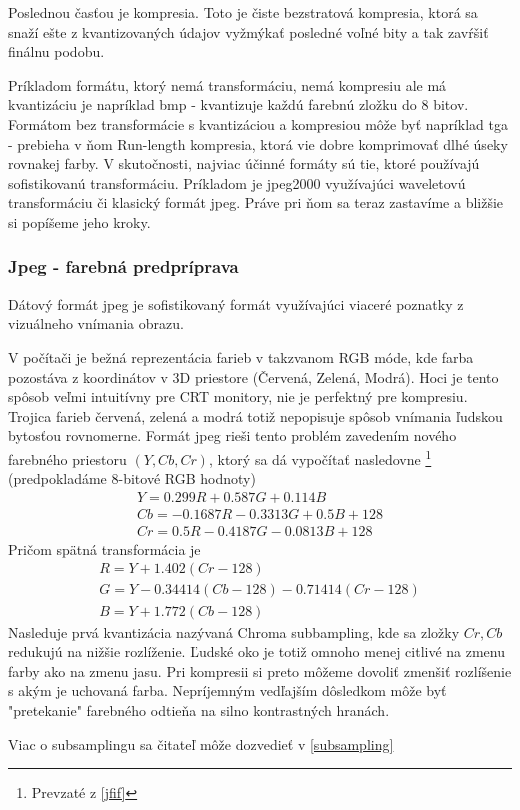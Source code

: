 Poslednou časťou je kompresia. Toto je čiste bezstratová kompresia,
ktorá sa snaží ešte z kvantizovaných údajov vyžmýkať posledné voľné
bity a tak zavŕšiť finálnu podobu.

Príkladom formátu, ktorý nemá transformáciu, nemá kompresiu ale má
kvantizáciu je napríklad bmp - kvantizuje každú farebnú zložku do 8
bitov. Formátom bez transformácie s kvantizáciou a kompresiou môže byť
napríklad tga - prebieha v ňom Run-length kompresia, ktorá vie dobre
komprimovať dlhé úseky rovnakej farby.
V skutočnosti, najviac účinné formáty sú tie, ktoré používajú
sofistikovanú transformáciu. Príkladom je jpeg2000 využívajúci
waveletovú transformáciu či klasický formát jpeg. Práve pri ňom sa
teraz zastavíme a bližšie si popíšeme jeho kroky.

\subsubsection{Jpeg - farebná predpríprava}
Dátový formát jpeg je sofistikovaný formát využívajúci viaceré
poznatky z vizuálneho vnímania obrazu.

V počítači je bežná reprezentácia farieb v takzvanom RGB móde, kde
farba pozostáva z koordinátov v 3D priestore (Červená, Zelená, Modrá).
Hoci je tento spôsob veľmi intuitívny pre CRT monitory, nie je
perfektný pre kompresiu. Trojica farieb červená, zelená a modrá totiž
nepopisuje spôsob vnímania ľudskou bytosťou rovnomerne. Formát jpeg
rieši tento problém zavedením nového farebného priestoru $(Y,Cb,Cr)$,
ktorý sa dá vypočítať nasledovne \footnote{Prevzaté z \ref{jfif}} (predpokladáme 8-bitové RGB hodnoty)
\begin{align}
    Y = 0.299 R + 0.587 G + 0.114 B \\
    Cb = -0.1687R - 0.3313G + 0.5B + 128 \\
    Cr = 0.5R - 0.4187 G - 0.0813B + 128
\end{align}
Pričom spätná transformácia je
\begin{align}
    R = Y + 1.402 (Cr - 128) \\
    G = Y - 0.34414 (Cb-128) - 0.71414 (Cr-128) \\
    B = Y + 1.772 (Cb - 128)
\end{align}
Nasleduje prvá kvantizácia nazývaná Chroma subbampling, 
kde sa zložky  $Cr, Cb$ redukujú na nižšie
rozlíženie. Ľudské oko je totiž omnoho menej citlivé na zmenu farby
ako na zmenu jasu. Pri kompresii si preto môžeme dovoliť zmenšiť
rozlíšenie s akým je uchovaná farba.
Nepríjemným vedľajším dôsledkom môže byť "pretekanie" farebného
odtieňa na silno kontrastných hranách.
\begin{poznamka}
Viac o subsamplingu sa čitateľ môže dozvedieť v 
\ref{subsampling}
\end{poznamka}


